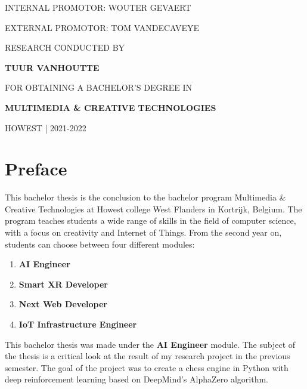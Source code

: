 \documentclass{article}
\begin{document}
\begin{titlepage}
\begin{adjustwidth}{1.5cm}{1.5cm}
    \MakeUppercase{Internal promotor: Wouter Gevaert}

    \MakeUppercase{External promotor: Tom Vandecaveye}

    \vspace{1em}

    \MakeUppercase{\small{Research conducted by}}

    \MakeUppercase{\Large\textbf{{Tuur Vanhoutte}}}

    \MakeUppercase{\small{for obtaining a bachelor's degree in}}

    \MakeUppercase{\Large{\textbf{{Multimedia \& Creative Technologies}}}}

    \MakeUppercase{Howest | 2021-2022}
    \end{adjustwidth}
\end{titlepage}


\newpage
\thispagestyle{empty}
\mbox{}
\newpage

\thispagestyle{empty}
\section*{Preface}

This bachelor thesis is the conclusion to the bachelor program Multimedia \& Creative Technologies at Howest college
West Flanders in Kortrijk, Belgium. The program teaches students a wide range of skills in the field of 
computer science, with a focus on creativity and Internet of Things. From the second year on, students can choose 
between four different modules:

\begin{enumerate}
    \item \textbf{AI Engineer}
    \item \textbf{Smart XR Developer}
    \item \textbf{Next Web Developer}
    \item \textbf{IoT Infrastructure Engineer}
\end{enumerate}

This bachelor thesis was made under the \textbf{AI Engineer} module.
The subject of the thesis is a critical look at the result of my research project 
in the previous semester. The goal of the project was to create a chess engine in Python with
deep reinforcement learning based on DeepMind's AlphaZero algorithm. 
\end{document}
